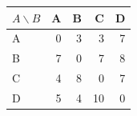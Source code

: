 \begin{tabular}{@{}lrrrr@{}}
\toprule
$A\backslash B$ & A & B & C & D\\
\midrule
A & 0 & 3 & 3 & 7\\
B & 7 & 0 & 7 & 8\\
C & 4 & 8 & 0 & 7\\
D & 5 & 4 & 10 & 0\\
\bottomrule
\end{tabular}
